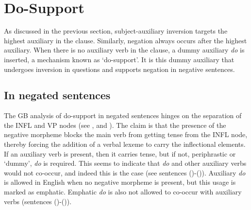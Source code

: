 \section{Do-Support}

As discussed in the previous section, subject-auxiliary inversion targets the
highest auxiliary in the clause. Similarly, negation always occurs after the
highest auxiliary. When there is no auxiliary verb in the clause, a dummy
auxiliary {\it do} is inserted, a mechanism known as `do-support'. It is this
dummy auxiliary that undergoes inversion in questions and supports negation in
negative sentences. 





\subsection{In negated sentences}
\label{do-support-negatives}

The GB analysis of do-support in negated sentences hinges on the separation of
the INFL and VP nodes (see \cite{chomsky65}, \cite{jackendoff72} and
\cite{chomsky86}).  The claim is that the presence of the negative morpheme
blocks the main verb from getting tense from the INFL node, thereby forcing the
addition of a verbal lexeme to carry the inflectional elements.  If an
auxiliary verb is present, then it carries tense, but if not, periphrastic or
`dummy', {\it do} is required.  This seems to indicate that {\it do} and other
auxiliary verbs would not co-occur, and indeed this is the case (see sentences
()-()).  Auxiliary {\it do} is allowed in English when no
negative morpheme is present, but this usage is marked as emphatic.  Emphatic
{\it do} is also not allowed to co-occur with auxiliary verbs (sentences
()-()).


